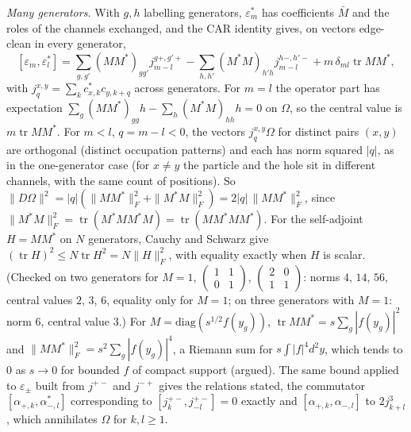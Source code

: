 \emph{Many generators.} With $g, h$ labelling generators, $\varepsilon_{m}^{*}$ has coefficients $\bar M$ and the roles of the channels exchanged, and the CAR identity gives, on vectors edge-clean in every generator,
\[
[\varepsilon_{m}, \varepsilon_{l}^{*}] = \sum_{g,g'}(MM^{*})_{gg'}j^{g+,g'+}_{m-l} - \sum_{h,h'}(M^{*}M)_{h'h}j^{h-,h'-}_{m-l} + m\,\delta_{ml}\operatorname{tr}MM^{*},
\]
with $j^{x,y}_{q} = \sum_{k}c_{x,k}^{*}c_{y,k+q}$ across generators. For $m = l$ the operator part has expectation $\sum_{g}(MM^{*})_{gg}h - \sum_{h}(M^{*}M)_{hh}h = 0$ on $\Omega$, so the central value is $m\operatorname{tr}MM^{*}$. For $m < l$, $q = m - l < 0$, the vectors $j^{x,y}_{q}\Omega$ for distinct pairs $(x, y)$ are orthogonal (distinct occupation patterns) and each has norm squared $|q|$, as in the one-generator case (for $x \ne y$ the particle and the hole sit in different channels, with the same count of positions). So $\|D\Omega\|^{2} = |q|(\|MM^{*}\|_{F}^{2} + \|M^{*}M\|_{F}^{2}) = 2|q|\,\|MM^{*}\|_{F}^{2}$, since $\|M^{*}M\|_{F}^{2} = \operatorname{tr}(M^{*}MM^{*}M) = \operatorname{tr}(MM^{*}MM^{*})$. For the self-adjoint $H = MM^{*}$ on $N$ generators, Cauchy and Schwarz give $(\operatorname{tr}H)^{2} \le N\operatorname{tr}H^{2} = N\|H\|_{F}^{2}$, with equality exactly when $H$ is scalar. (Checked on two generators for $M = 1$, $\begin{pmatrix}1&1\\0&1\end{pmatrix}$, $\begin{pmatrix}2&0\\1&1\end{pmatrix}$: norms $4$, $14$, $56$, central values $2$, $3$, $6$, equality only for $M = 1$; on three generators with $M = 1$: norm $6$, central value $3$.) For $M = \mathrm{diag}(s^{1/2}f(y_{g}))$, $\operatorname{tr}MM^{*} = s\sum_{g}|f(y_{g})|^{2}$ and $\|MM^{*}\|_{F}^{2} = s^{2}\sum_{g}|f(y_{g})|^{4}$, a Riemann sum for $s\int|f|^{4}d^{2}y$, which tends to $0$ as $s \to 0$ for bounded $f$ of compact support (argued). The same bound applied to $\varepsilon_{\pm}$ built from $j^{+-}$ and $j^{-+}$ gives the relations stated, the commutator $[\alpha_{+,k}, \alpha_{-,l}^{*}]$ corresponding to $[j^{+-}_{k}, j^{+-}_{-l}] = 0$ exactly and $[\alpha_{+,k}, \alpha_{-,l}]$ to $2j^{3}_{k+l}$, which annihilates $\Omega$ for $k, l \ge 1$.
